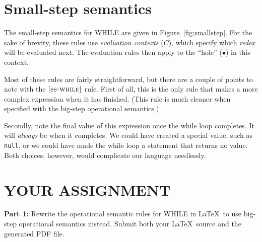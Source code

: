 \documentclass{article}
\newcommand{\rel}[1]{ \mbox{\sc [#1]} }
\begin{document}
\section{Small-step semantics}

\newcommand{\ssrule}[3]{
  \rel{#1} &
  \frac{\strut\begin{array}{@{}c@{}} #2 \end{array}}
       {\strut\begin{array}{@{}c@{}} #3 \end{array}}
   \\~\\
}
\newcommand{\sstep}[4]{\ctxt[{#1}],{#2} \rightarrow \ctxt[{#3}],{#4}}
\newcommand{\sstepraw}[4]{{#1},{#2} \rightarrow {#3},{#4}}
\newcommand{\ctxt}{C}

The small-step semantics for WHILE are given in Figure~\ref{fig:smallstep}.
For the sake of brevity, these rules use \emph{evaluation contexts} ($\ctxt$),
which specify which \emph{redex} will be evaluated next.
The evaluation rules then apply to the ``hole'' ($\bullet$) in this context.

Most of these rules are fairly straightforward, but there are a couple of points
to note with the $\rel{ss-while}$ rule.
First of all, this is the only rule that makes a more complex expression
when it has finished.
(This rule is much cleaner when specified with the big-step operational semantics.)

Secondly, note the final value of this expression once the while loop completes.
It will \emph{always} be {\false} when it completes.
We could have created a special value, such as {\tt null},
or we could have made the while loop a statement that returns no value.
Both choices, however, would complicate our language needlessly.


\section{YOUR ASSIGNMENT}
\newcommand{\bstep}[4]{{#1},{#2} \Downarrow {#3},{#4}}
\newcommand{\bsrule}[3]{
  \rel{#1} &
  \frac{\strut\begin{array}{@{}c@{}} #2 \end{array}}
       {\strut\begin{array}{@{}c@{}} #3 \end{array}}
   \\[16pt]
}

\noindent
{\bf Part 1:}
Rewrite the operational semantic rules for WHILE in \LaTeX\
to use big-step operational semantics instead.
Submit both your \LaTeX\ source and the generated PDF file.
\end{document}

